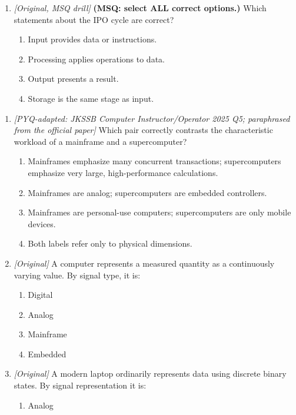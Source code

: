 \begin{enumerate}[label=\textbf{Q\arabic*.}, leftmargin=*]
\item \textit{[Original, MSQ drill]} \textbf{(MSQ: select ALL correct options.)} Which statements about the IPO cycle are correct?
  \begin{enumerate}[label=\Alph*.]
\item Input provides data or instructions.
   \item Processing applies operations to data.
   \item Output presents a result.
   \item Storage is the same stage as input.
  \end{enumerate}

\end{enumerate}
\begin{enumerate}[label=\textbf{Q\arabic*.}, leftmargin=*]
\item \textit{[PYQ-adapted: JKSSB Computer Instructor/Operator 2025 Q5;
paraphrased from the official paper]} Which pair correctly contrasts the
characteristic workload of a mainframe and a supercomputer?
  \begin{enumerate}[label=\Alph*.]
    \item Mainframes emphasize many concurrent transactions; supercomputers
      emphasize very large, high-performance calculations.
    \item Mainframes are analog; supercomputers are embedded controllers.
    \item Mainframes are personal-use computers; supercomputers are only
      mobile devices.
    \item Both labels refer only to physical dimensions.
  \end{enumerate}
\item \textit{[Original]} A computer represents a measured quantity as a
  continuously varying value. By signal type, it is:
  \begin{enumerate}[label=\Alph*.]
    \item Digital
    \item Analog
    \item Mainframe
    \item Embedded
  \end{enumerate}
\item \textit{[Original]} A modern laptop ordinarily represents data using
  discrete binary states. By signal representation it is:
  \begin{enumerate}[label=\Alph*.]
    \item Analog

\end{enumerate}
\end{enumerate}
